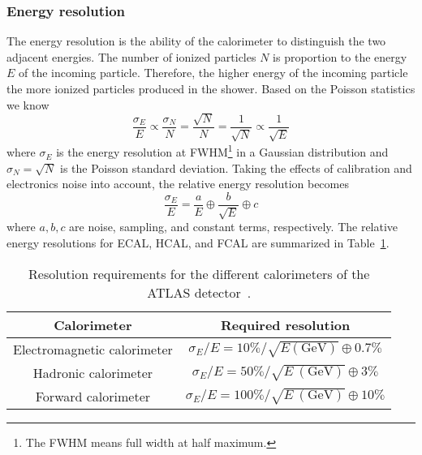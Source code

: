 
\subsubsection{Energy resolution}
\label{subsubsed:ae_energy_resolution}
The energy resolution is the ability of the calorimeter to distinguish the two adjacent energies.
The number of ionized particles $N$ is proportion to the energy $E$ of the incoming particle.
%
%
Therefore, the higher energy of the incoming particle the more ionized particles produced in the shower.
Based on the Poisson statistics we know
%
\begin{equation}
    \frac{\sigma_{E}}{E} \propto \frac{\sigma_{N}}{N} = \frac{\sqrt{N}}{N} = \frac{1}{\sqrt{N}} \propto \frac{1}{\sqrt{E}}
    \label{eq:ae_energy_resolution}
\end{equation}
%
where $\sigma_{E}$ is the energy resolution at FWHM\footnote{The FWHM means full width at half maximum.} in a Gaussian distribution and $\sigma_{N} = \sqrt{N}$ is the Poisson standard deviation.
Taking the effects of calibration and electronics noise into account, the relative energy resolution becomes
%
\begin{equation}
    \frac{\sigma_{E}}{E} = \frac{a}{E} \oplus \frac{b}{\sqrt{E}} \oplus c
    \label{eq:ae_relative_energy_resolution}
\end{equation}
%
where $a, b, c$ are noise, sampling, and constant terms, respectively.
The relative energy resolutions for ECAL, HCAL, and FCAL are summarized in Table~\ref{tab:ae_relative_energy_resolution}.

\begin{table}[htbp]
    \begin{center}
        {\footnotesize
            \begin{tabular}{cc}
                \hline
                \hline
                Calorimeter                 & Required resolution\\
                \hline
                Electromagnetic calorimeter & $\sigma_{E}/E = 10\% / \sqrt{E\mathrm{ (GeV)}} \oplus 0.7\%$\\
                Hadronic calorimeter        & $\sigma_{E}/E = 50\% / \sqrt{E~\mathrm{(GeV)}} \oplus 3\%$\\
                Forward calorimeter         & $\sigma_{E}/E = 100\% / \sqrt{E~\mathrm{(GeV)}} \oplus 10\%$\\
                \hline
                \hline
            \end{tabular}
        }
    \end{center}
    \caption{Resolution requirements for the different calorimeters of the ATLAS detector~\cite{Aad:2008zzm}.}
    \label{tab:ae_relative_energy_resolution}
\end{table}%


